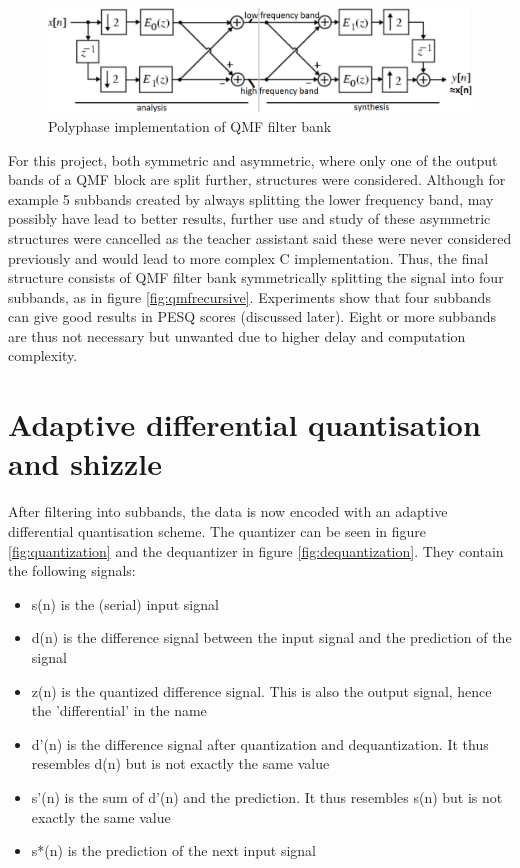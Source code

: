 \documentclass[a4paper]{article}
\begin{document}
\begin{figure}[hbt]
\includegraphics[width = \textwidth]{qmf}
\caption{Polyphase implementation of QMF filter bank}
\label{fig:qmf}
\end{figure}

For this project, both symmetric and asymmetric, where only one of the output bands of a QMF block are split further, structures were considered. Although for example 5 subbands created by always splitting the lower frequency band, may possibly have lead to better results, further use and study of these asymmetric structures were cancelled as the teacher assistant said these were never considered previously and would lead to more complex C implementation. Thus, the final structure consists of QMF filter bank symmetrically splitting the signal into four subbands, as in figure \ref{fig:qmfrecursive}. Experiments show that four subbands can give good results in PESQ scores (discussed later). Eight or more subbands are thus not necessary but unwanted due to higher delay and computation complexity.

\section{Adaptive differential quantisation and shizzle}
After filtering into subbands, the data is now encoded with an adaptive differential quantisation scheme. The quantizer can be seen in figure \ref{fig:quantization} and the dequantizer in figure \ref{fig:dequantization}. They contain the following signals:

\begin{itemize}
\item s(n) is the (serial) input signal
\item d(n) is the difference signal between the input signal and the prediction of the signal
\item z(n) is the quantized difference signal. This is also the output signal, hence the 'differential' in the name
\item d'(n) is the difference signal after quantization and dequantization. It thus resembles d(n) but is not exactly the same value
\item s'(n) is the sum of d'(n) and the prediction. It thus resembles s(n) but is not exactly the same value
\item s*(n) is the prediction of the next input signal 
\end{itemize}
\end{document}
